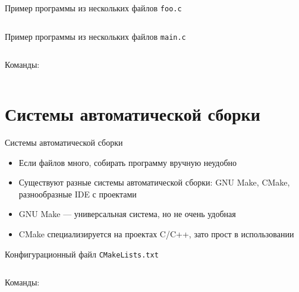 \documentclass[handout]{beamer}
\begin{document}
\begin{frame}{Пример программы из нескольких файлов}
	\texttt{foo.с}
	\inputminted[linenos,bgcolor=listing,fontsize=\small]{C}{files/c_programming_langauge/example_foo.c}
\end{frame}

\begin{frame}{Пример программы из нескольких файлов}
	\texttt{main.c}
	\inputminted[linenos,bgcolor=listing,fontsize=\small]{C}{files/c_programming_langauge/example_main.c}
	Команды:
	\inputminted[bgcolor=listing,fontsize=\small]{bash}{files/c_programming_langauge/example_compile.sh}
\end{frame}

\section{Системы автоматической сборки}
\begin{frame}{Системы автоматической сборки}
	\begin{itemize}
		\item{Если файлов много, собирать программу вручную неудобно}\pause
		\item{Существуют разные системы автоматической сборки: GNU Make, CMake, разнообразные IDE с проектами}\pause
		\item{GNU Make --- универсальная система, но не очень удобная}\pause
		\item{CMake специализируется на проектах C/C++, зато прост в использовании}
	\end{itemize}
\end{frame}

\begin{frame}{Конфигурационный файл}
	\texttt{CMakeLists.txt}
	\inputminted[linenos,bgcolor=listing,fontsize=\small]{CMake}{files/c_programming_langauge/CMakeLists.txt}
	Команды:
	\inputminted[bgcolor=listing,fontsize=\small]{bash}{files/c_programming_langauge/example_cmake.sh}
\end{frame}
\end{document}
